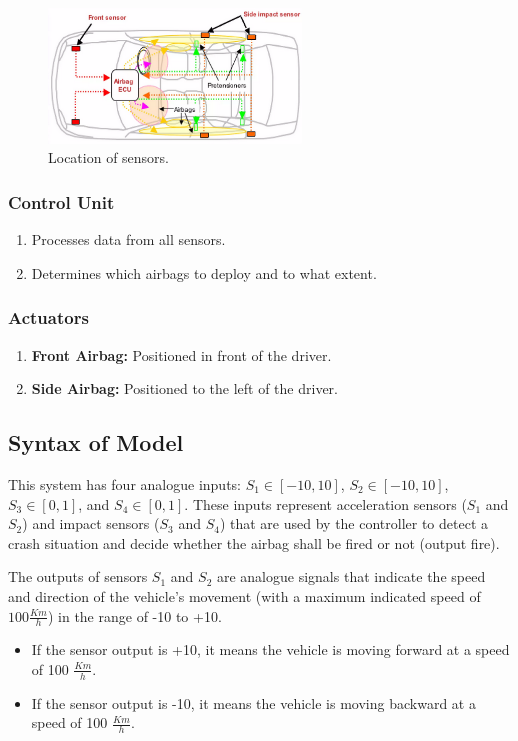 \documentclass[12pt	]{article}
\begin{document}
\begin{figure}[h]
	\centering
	\includegraphics[width=0.6\textwidth]{Images/img7.png}
	\caption{Location of sensors.}
	\label{fig:Location of sensors}
\end{figure}


\subsubsection{Control Unit}
\begin{enumerate}
	\item Processes data from all sensors.
	\item Determines which airbags to deploy and to what extent.
\end{enumerate}

\subsubsection{Actuators}
\begin{enumerate}
	\item \textbf{Front Airbag:} Positioned in front of the driver.
	\item \textbf{Side Airbag:} Positioned to the left of the driver.
\end{enumerate}


\subsection{Syntax of Model}
This system has four analogue inputs: $S_1 \in [-10, 10]$, $S_2\in [-10, 10]$, $S_3 \in [0, 1]$, and $S_4 \in [0, 1]$. These inputs represent acceleration sensors ($S_1$ and $S_2$) and impact sensors ($S_3$ and $S_4$) that are used by the controller to detect a crash situation and decide whether the airbag shall be fired or not (output fire).

The outputs of sensors $S_1$ and $S_2$ are analogue signals that indicate the speed and direction of the vehicle's movement (with a maximum indicated speed of $100 \frac{Km}{h}$) in the range of -10 to +10.
\begin{itemize}
	\item 
	If the sensor output is +10, it means the vehicle is moving forward at a speed of 100 $\frac{Km}{h}$.
	
	\item
	If the sensor output is -10, it means the vehicle is moving backward at a speed of 100 $\frac{Km}{h}$.
\end{itemize}
\end{document}

